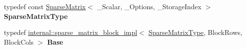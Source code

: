 \begin{DoxyCompactItemize}
typedef const \hyperlink{group___sparse_core___module_class_eigen_1_1_sparse_matrix}{Sparse\+Matrix}$<$ \+\_\+\+Scalar, \+\_\+\+Options, \+\_\+\+Storage\+Index $>$ {\bfseries Sparse\+Matrix\+Type}
\item 
\mbox{\label{class_eigen_1_1_block_impl_3_01const_01_sparse_matrix_3_01___scalar_00_01___options_00_01___store3fd33d94eaf95572721ac85ec6beb63_a5cc4672b2331279180c9af148ebfdfea}} 
typedef \hyperlink{class_eigen_1_1internal_1_1sparse__matrix__block__impl}{internal\+::sparse\+\_\+matrix\+\_\+block\+\_\+impl}$<$ \hyperlink{group___sparse_core___module_class_eigen_1_1_sparse_matrix}{Sparse\+Matrix\+Type}, Block\+Rows, Block\+Cols $>$ {\bfseries Base}
\end{DoxyCompactItemize}

